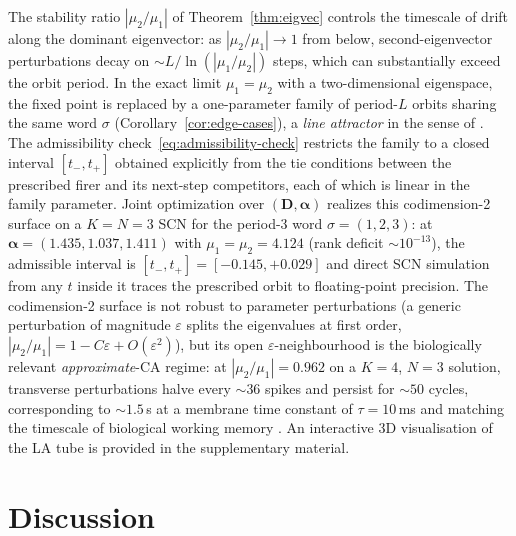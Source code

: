 \documentclass[12pt]{article}
\newcommand{\vv}[1]{\mathbf{#1}}
\begin{document}
 The stability ratio $|\mu_2/\mu_1|$ of Theorem~\ref{thm:eigvec} controls the timescale of drift along the dominant eigenvector: as $|\mu_2/\mu_1|\to 1$ from below, second-eigenvector perturbations decay on ${\sim}L/\ln(|\mu_1/\mu_2|)$ steps, which can substantially exceed the orbit period. In the exact limit $\mu_1=\mu_2$ with a two-dimensional eigenspace, the fixed point is replaced by a one-parameter family of period-$L$ orbits sharing the same word $\sigma$ (Corollary~\ref{cor:edge-cases}), a \emph{line attractor} in the sense of \citet{seung1996brain}. The admissibility check~\eqref{eq:admissibility-check} restricts the family to a closed interval $[t_-,t_+]$ obtained explicitly from the tie conditions between the prescribed firer and its next-step competitors, each of which is linear in the family parameter. Joint optimization over $(\vv{D},\boldsymbol{\alpha})$ realizes this codimension-2 surface on a $K=N=3$ SCN for the period-3 word $\sigma=(1,2,3)$: at $\boldsymbol{\alpha}=(1.435,1.037,1.411)$ with $\mu_1=\mu_2=4.124$ (rank deficit ${\sim}10^{-13}$), the admissible interval is $[t_-,t_+]=[-0.145,+0.029]$ and direct SCN simulation from any $t$ inside it traces the prescribed orbit to floating-point precision. The codimension-2 surface is not robust to parameter perturbations (a generic perturbation of magnitude $\varepsilon$ splits the eigenvalues at first order, $|\mu_2/\mu_1|=1-C\varepsilon+O(\varepsilon^2)$), but its open $\varepsilon$-neighbourhood is the biologically relevant \emph{approximate}-CA regime: at $|\mu_2/\mu_1|=0.962$ on a $K=4$, $N=3$ solution, transverse perturbations halve every ${\sim}36$ spikes and persist for ${\sim}50$ cycles, corresponding to ${\sim}1.5$\,s at a membrane time constant of $\tau=10$\,ms and matching the timescale of biological working memory \citep{Sagodi2024a}. An interactive 3D visualisation of the LA tube is provided in the supplementary material.


\section{Discussion}\label{sec:discussion}
\end{document}

